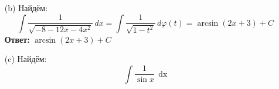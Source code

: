 \documentclass[a4paper]{article}
\renewcommand{\phi}{\varphi}
\newcommand{\dx}{\;\text{dx}}
\begin{document}
\begin{enumerate}
\begin{enumerate}
        \item[(b)]Найдём:
        $$\int \frac{1}{\sqrt{-8 - 12x - 4x^2}} \, dx = \int \frac{1}{\sqrt{1 - t^2}} \, d\phi(t)
         = \arcsin(2x+3) + C$$
         \textbf{Ответ: } $\arcsin(2x+3) + C$

        \item[(c)]Найдём:
        $$\int \frac{1}{\sin x} \, \dx$$
    \end{enumerate}
\end{enumerate}
\end{document}
